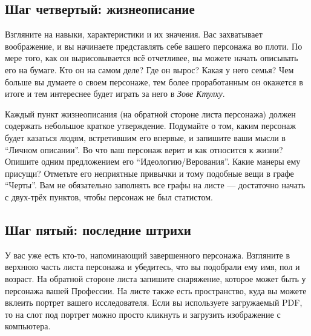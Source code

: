 \documentclass[letterpaper,twocolumn,openany, twoside, 11pt, usenames]{cocbook}
\begin{document}
\subsection*{Шаг четвертый: жизнеописание}

Взгляните на навыки, характеристики и их значения. Вас захватывает воображение, и вы начинаете представлять себе вашего персонажа во плоти. По мере того, как он вырисовывается всё отчетливее, вы можете начать описывать его на бумаге. Кто он на самом деле? Где он вырос? Какая у него семья? Чем больше вы думаете о своем персонаже, тем более проработанным он окажется в итоге и тем интереснее будет играть за него в {\it Зове Ктулху}.

Каждый пункт жизнеописания (на обратной стороне листа персонажа) должен содержать небольшое краткое утверждение. Подумайте о том, каким персонаж будет казаться людям, встретившим его впервые, и запишите ваши мысли в ``Личном описании''. Во что ваш персонаж верит и как относится к жизни? Опишите одним предложением его ``Идеологию/Верования''. Какие манеры ему присущи? Отметьте его неприятные привычки и тому подобные вещи в графе ``Черты''. Вам не обязательно заполнять все графы на листе --- достаточно начать с двух-трёх пунктов, чтобы персонаж не был статистом.
\smallbreak
\noindent {}

\subsection*{Шаг пятый: последние штрихи}

У вас уже есть кто-то, напоминающий завершенного персонажа. Взгляните в верхнюю часть листа персонажа и убедитесь, что вы подобрали ему имя, пол и возраст. На обратной стороне листа запишите снаряжение, которое может быть у персонажа вашей Профессии.
\smallbreak
\noindent {}
\smallbreak
На листе также есть пространство, куда вы можете вклеить портрет вашего исследователя. Если вы используете загружаемый PDF, то на слот под портрет можно просто кликнуть и загрузить изображение с компьютера.
\end{document}
